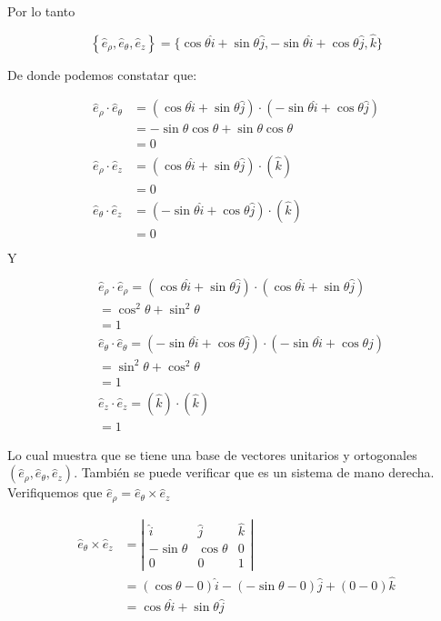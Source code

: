 Por lo tanto

$$
\left\{\widehat{e}_{\rho}, \hat{e}_{\theta}, \hat{e}_{z}\right\}=\{\cos \theta \hat{i}+\sin \theta \hat{j},-\sin \theta \hat{i}+\cos \theta \hat{j}, \hat{k}\}
$$

De donde podemos constatar que:

$$
\begin{aligned}
\widehat{e}_{\rho} \cdot \hat{e}_{\theta} & =(\cos \theta \hat{i}+\sin \theta \hat{j}) \cdot(-\sin \theta \hat{i}+\cos \theta \hat{j}) \\
& =-\sin \theta \cos \theta+\sin \theta \cos \theta \\
& =0 \\
\hat{e}_{\rho} \cdot \widehat{e}_{z} & =(\cos \theta \hat{i}+\sin \theta \hat{j}) \cdot(\hat{k}) \\
& =0 \\
\widehat{e}_{\theta} \cdot \hat{e}_{z} & =(-\sin \theta \hat{i}+\cos \theta \hat{j}) \cdot(\hat{k}) \\
& =0
\end{aligned}
$$

$\mathrm{Y}$

$$
\begin{aligned}
& \hat{e}_{\rho} \cdot \hat{e}_{\rho}=(\cos \theta \hat{i}+\sin \theta \hat{j}) \cdot(\cos \theta \hat{i}+\sin \theta \hat{j}) \\
& =\cos ^{2} \theta+\sin ^{2} \theta \\
& =1 \\
& \widehat{e}_{\theta} \cdot \hat{e}_{\theta}=(-\sin \theta \hat{i}+\cos \theta \hat{j}) \cdot(-\sin \theta \hat{i}+\cos \theta \hat{j}) \\
& =\sin ^{2} \theta+\cos ^{2} \theta \\
& =1 \\
& \hat{e}_{z} \cdot \hat{e}_{z}=(\hat{k}) \cdot(\widehat{k}) \\
& =1
\end{aligned}
$$

Lo cual muestra que se tiene una base de vectores unitarios y ortogonales $\left(\hat{e}_{\rho}, \hat{e}_{\theta}, \hat{e}_{z}\right)$. También se puede verificar que es un sistema de mano derecha. Verifiquemos que $\widehat{e}_{\rho}=\hat{e}_{\theta} \times \hat{e}_{z}$

$$
\begin{aligned}
\hat{e}_{\theta} \times \widehat{e}_{z} & =\left|\begin{array}{ccc}
\hat{i} & \hat{j} & \hat{k} \\
-\sin \theta & \cos \theta & 0 \\
0 & 0 & 1
\end{array}\right| \\
& =(\cos \theta-0) \hat{i}-(-\sin \theta-0) \hat{j}+(0-0) \hat{k} \\
& =\cos \theta \hat{i}+\sin \theta \hat{j}
\end{aligned}
$$

